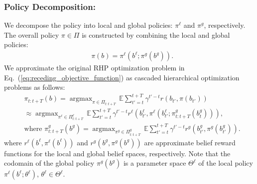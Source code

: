 \documentclass[letterpaper]{article} %
\newcommand{\ph}[1]{{\textbf{#1}:}} %
\newcommand{\argmax}{\mathop{\mathrm{argmax}}}
\begin{document}
\subsubsection{Policy Decomposition:} \hfill
\vspace{-0.25pt}

\noindent
We decompose the policy into local and global policies: $\pi^\ell$ and $\pi^g$, respectively. The overall policy $\pi \in \Pi$ is constructed by combining the local and global policies:
\begin{align}
  &\pi(b) = \pi^\ell(b^\ell; \pi^g(b^g)).
\end{align}
%
We approximate the original RHP optimization problem in Eq.~(\ref{eq:receding_objective_function}) as cascaded hierarchical optimization problems as follows:
\begin{align}
  &\pi_{t:t+T}(b)
  = \argmax_{\pi \in \Pi_{t:t+T}} \, \mathbb{E} \sum_{t'=t}^{t+T} \gamma^{t'-t} r(b_{t'}, \pi(b_{t'}))
  \nonumber \\
  & \approx \argmax_{\pi^\ell \in \Pi^\ell_{t:t+T}} \, \mathbb{E} \sum_{t'=t}^{t+T} \gamma^{t'-t} r^\ell(b^\ell_{t'}, \pi^\ell(b^\ell_{t'}; \pi_{t:t+T}^g(b^g_t))),
  \label{eq:llp_optimization}
  \\
  &\text{where }
  \pi_{t:t+T}^g(b^g) = \argmax_{\pi^g \in \Pi^g_{t:t+T}} \, \mathbb{E} \sum_{t'=t}^{t+T} \gamma^{t'-t} r^g(b^g_{t'}, \pi^g(b^g_{t'})).
  \label{eq:glp_optimization}
\end{align}
\normalsize
where $r^\ell(b^\ell, \pi^\ell(b^\ell))$ and $r^g(b^g, \pi^g(b^g))$ are approximate belief reward functions for the local and global belief spaces, respectively.
%
Note that the codomain of the global policy $\pi^g(b^g)$ is a parameter space $\Theta^\ell$ of the local policy $\pi^\ell(b^\ell; \theta^\ell)$, $\theta^\ell \!\! \in \! \Theta^\ell\!$.\,
\end{document}
